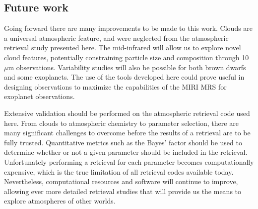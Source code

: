 \subsection{Future work}
Going forward there are many improvements to be made to this work.
Clouds are a universal atmospheric feature, and were neglected from the atmospheric retrieval study presented here.
The mid-infrared will allow us to explore novel cloud features, potentially constraining particle size and composition through 10 $\mu$m observations.
Variability studies will also be possible for both brown dwarfs and some exoplanets.
The use of the tools developed here could prove useful in designing observations to maximize the capabilities of the MIRI MRS for exoplanet observations.

Extensive validation should be performed on the atmospheric retrieval code used here.
From clouds to atmospheric chemistry to parameter selection, there are many significant challenges to overcome before the results of a retrieval are to be fully trusted.
Quantitative metrics such as the Bayes' factor should be used to determine whether or not a given parameter should be included in the retrieval.
Unfortunately performing a retrieval for each parameter becomes computationally expensive, which is the true limitation of all retrieval codes available today.
Nevertheless, computational resources and software will continue to improve, allowing ever more detailed retrieval studies that will provide us the means to explore atmospheres of other worlds.